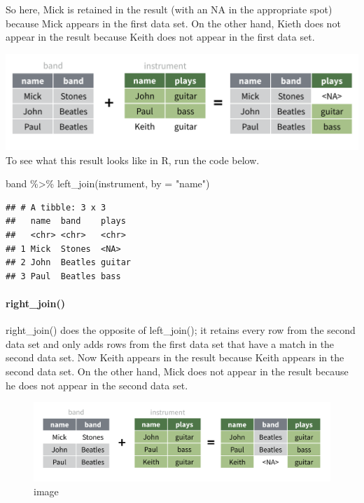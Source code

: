 \documentclass[
]{article}
\newenvironment{Shaded}{\begin{snugshade}}{\end{snugshade}}
\newcommand{\AttributeTok}[1]{\textcolor[rgb]{0.77,0.63,0.00}{#1}}
\newcommand{\FunctionTok}[1]{\textcolor[rgb]{0.00,0.00,0.00}{#1}}
\newcommand{\NormalTok}[1]{#1}
\newcommand{\SpecialCharTok}[1]{\textcolor[rgb]{0.00,0.00,0.00}{#1}}
\newcommand{\StringTok}[1]{\textcolor[rgb]{0.31,0.60,0.02}{#1}}
\begin{document}
So here, Mick is retained in the result (with an NA in the appropriate
spot) because Mick appears in the first data set. On the other hand,
Kieth does not appear in the result because Keith does not appear in the
first data set.

\includegraphics{data/left-join.png} To see what this result looks like
in R, run the code below.

\begin{Shaded}
\begin{Highlighting}[]
\NormalTok{band }\SpecialCharTok{\%\textgreater{}\%} \FunctionTok{left\_join}\NormalTok{(instrument, }\AttributeTok{by =} \StringTok{"name"}\NormalTok{)}
\end{Highlighting}
\end{Shaded}

\begin{verbatim}
## # A tibble: 3 x 3
##   name  band    plays 
##   <chr> <chr>   <chr> 
## 1 Mick  Stones  <NA>  
## 2 John  Beatles guitar
## 3 Paul  Beatles bass
\end{verbatim}

\hypertarget{right_join}{%
\paragraph{right\_join()}\label{right_join}}

right\_join() does the opposite of left\_join(); it retains every row
from the second data set and only adds rows from the first data set that
have a match in the second data set. Now Keith appears in the result
because Keith appears in the second data set. On the other hand, Mick
does not appear in the result because he does not appear in the second
data set.

\begin{figure}
\centering
\includegraphics{data/right-join.png}
\caption{image}
\end{figure}
\end{document}
